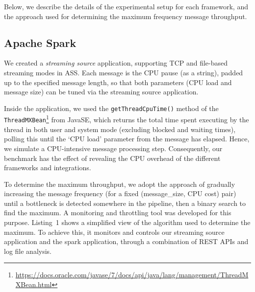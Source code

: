 \documentclass[letterpaper,conference]{IEEEtran}
\begin{document}
Below, we describe the details of the experimental setup for each framework, and the approach used for determining the maximum frequency message throughput.

\subsection{Apache Spark}


We created a \emph{streaming source} application, supporting TCP and file-based streaming modes in ASS. 
Each message is the CPU pause (as a string), padded up to the specified message length, so that both parameters (CPU load and message size) can be tuned via the streaming source application. 

Inside the application, we used the \texttt{getThreadCpuTime()} method of the \texttt{ThreadMXBean}\footnote{\url{https://docs.oracle.com/javase/7/docs/api/java/lang/management/ThreadMXBean.html}} from JavaSE, which returns the total time spent executing by the thread in both user and system mode (excluding blocked and waiting times), polling this until the `CPU load' parameter from the message has elapsed. Hence, we simulate a CPU-intensive message processing step. Consequently, our benchmark has the effect of revealing the CPU overhead of the different frameworks and integrations. 


To determine the maximum throughput, we adopt the approach of gradually increasing the message frequency (for a fixed (message\_size, CPU cost) pair) until a bottleneck is detected somewhere in the pipeline, then a binary search to find the maximum. A monitoring and throttling tool was developed for this purpose. Listing~1 shows a simplified view of the algorithm used to determine the maximum. To achieve this, it monitors and controls our streaming source application and the spark application, through a combination of REST APIs and log file analysis. 
\end{document}
